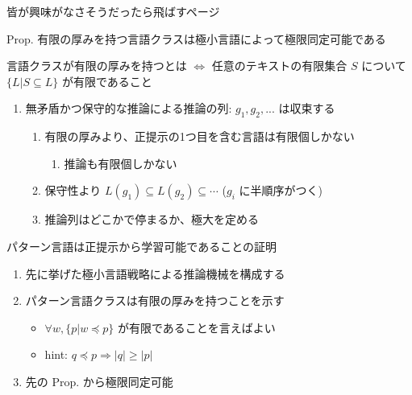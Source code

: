 \documentclass[professionalfont, 12pt, dvipdfmx, default, cjk]{beamer}
\begin{document}
\begin{frame}{皆が興味がなさそうだったら飛ばすページ}

\begin{block}{Prop.
有限の厚みを持つ言語クラスは極小言語によって極限同定可能である}

言語クラスが有限の厚みを持つとは \(\iff\) 任意のテキストの有限集合 \(S\)
について \(\{ L | S \subseteq L \}\) が有限であること

\begin{enumerate}
\def\labelenumi{\arabic{enumi}.}
\itemsep1pt\parskip0pt
\item
  無矛盾かつ保守的な推論による推論の列: \(g_1, g_2, ...\) は収束する

  \begin{enumerate}
  \def\labelenumii{\arabic{enumii}.}
  \itemsep1pt\parskip0pt
  \item
    有限の厚みより、正提示の1つ目を含む言語は有限個しかない

    \begin{enumerate}
    \def\labelenumiii{\arabic{enumiii}.}
    \itemsep1pt\parskip0pt
    \item
      推論も有限個しかない
    \end{enumerate}
  \item
    保守性より \(L(g_1) \subseteq L(g_2) \subseteq \cdots\) (\(g_i\)
    に半順序がつく)
  \item
    推論列はどこかで停まるか、極大を定める
  \end{enumerate}
\end{enumerate}

\end{block}

\end{frame}

\begin{frame}{パターン言語は正提示から学習可能であることの証明}

\begin{enumerate}
\def\labelenumi{\arabic{enumi}.}
\itemsep1pt\parskip0pt
\item
  先に挙げた極小言語戦略による推論機械を構成する
\item
  パターン言語クラスは有限の厚みを持つことを示す

  \begin{itemize}
  \itemsep1pt\parskip0pt
  \item
    \(\forall w, \{ p | w \preceq p \}\) が有限であることを言えばよい
  \item
    hint: \(q \preceq p \Rightarrow |q| \geq |p|\)
  \end{itemize}
\item
  先の Prop. から極限同定可能
\end{enumerate}

\end{frame}
\end{document}
